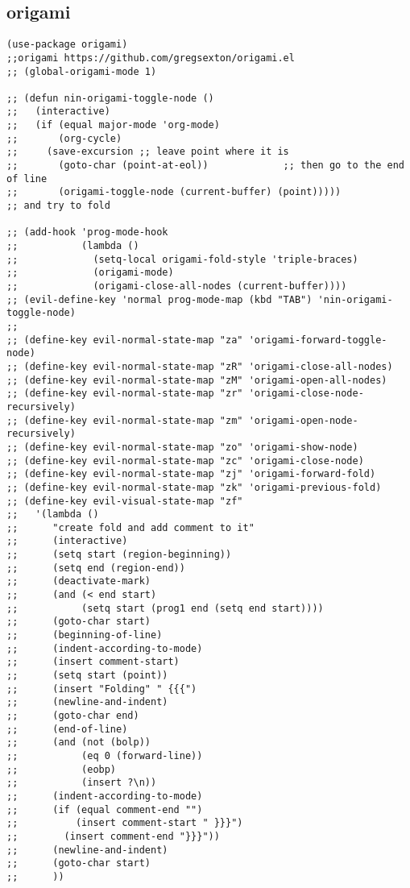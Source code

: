 \documentclass[11pt]{article}
\begin{document}
\subsection{origami}
\label{sec:org21829bc}
\begin{verbatim}
(use-package origami)
;;origami https://github.com/gregsexton/origami.el
;; (global-origami-mode 1)

;; (defun nin-origami-toggle-node ()
;;   (interactive)
;;   (if (equal major-mode 'org-mode)
;;       (org-cycle)
;;     (save-excursion ;; leave point where it is
;;       (goto-char (point-at-eol))             ;; then go to the end of line
;;       (origami-toggle-node (current-buffer) (point)))))                 ;; and try to fold

;; (add-hook 'prog-mode-hook
;;           (lambda ()
;;             (setq-local origami-fold-style 'triple-braces)
;;             (origami-mode)
;;             (origami-close-all-nodes (current-buffer))))
;; (evil-define-key 'normal prog-mode-map (kbd "TAB") 'nin-origami-toggle-node)
;; 
;; (define-key evil-normal-state-map "za" 'origami-forward-toggle-node)
;; (define-key evil-normal-state-map "zR" 'origami-close-all-nodes)
;; (define-key evil-normal-state-map "zM" 'origami-open-all-nodes)
;; (define-key evil-normal-state-map "zr" 'origami-close-node-recursively)
;; (define-key evil-normal-state-map "zm" 'origami-open-node-recursively)
;; (define-key evil-normal-state-map "zo" 'origami-show-node)
;; (define-key evil-normal-state-map "zc" 'origami-close-node)
;; (define-key evil-normal-state-map "zj" 'origami-forward-fold)
;; (define-key evil-normal-state-map "zk" 'origami-previous-fold)
;; (define-key evil-visual-state-map "zf"
;;   '(lambda ()
;;      "create fold and add comment to it"
;;      (interactive)
;;      (setq start (region-beginning))
;;      (setq end (region-end))
;;      (deactivate-mark)
;;      (and (< end start)
;;           (setq start (prog1 end (setq end start))))
;;      (goto-char start)
;;      (beginning-of-line)
;;      (indent-according-to-mode)
;;      (insert comment-start)
;;      (setq start (point))
;;      (insert "Folding" " {{{")
;;      (newline-and-indent)
;;      (goto-char end)
;;      (end-of-line)
;;      (and (not (bolp))
;;           (eq 0 (forward-line))
;;           (eobp)
;;           (insert ?\n))
;;      (indent-according-to-mode)
;;      (if (equal comment-end "")
;;          (insert comment-start " }}}")
;;        (insert comment-end "}}}"))
;;      (newline-and-indent)
;;      (goto-char start)
;;      ))
\end{verbatim}
\end{document}
